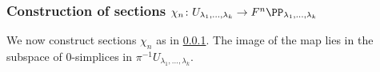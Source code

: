 \documentclass[a4paper,10pt]{amsart}
\begin{document}
\subsubsection{Construction of sections $\chi_n \colon U_{\lambda_1,...,\lambda_k} \to F^n \PP_{\lambda_1,...,\lambda_k}$}
We now construct sections $\chi_n$ as in \ref{}. The image of the map lies in the subspace of $0$-simplices in $\pi^{-1}U_{\lambda_1,...,\lambda_k}$.

\end{document}
